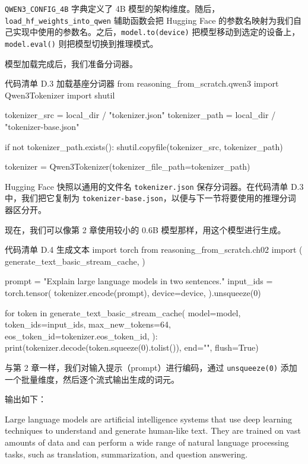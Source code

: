 \texttt{QWEN3\_CONFIG\_4B} 字典定义了 4B 模型的架构维度。随后，\texttt{load\_hf\_weights\_into\_qwen} 辅助函数会把 Hugging Face 的参数名映射为我们自己实现中使用的参数名。之后，\texttt{model.to(device)} 把模型移动到选定的设备上，\texttt{model.eval()} 则把模型切换到推理模式。

模型加载完成后，我们准备分词器。

\begin{codeboxt}{代码清单 D.3 加载基座分词器}
from reasoning_from_scratch.qwen3 import Qwen3Tokenizer
import shutil

tokenizer_src = local_dir / "tokenizer.json"
tokenizer_path = local_dir / "tokenizer-base.json"

if not tokenizer_path.exists():
    shutil.copyfile(tokenizer_src, tokenizer_path)

tokenizer = Qwen3Tokenizer(tokenizer_file_path=tokenizer_path)
\end{codeboxt}

Hugging Face 快照以通用的文件名 \texttt{tokenizer.json} 保存分词器。在代码清单 D.3 中，我们把它复制为 \texttt{tokenizer-base.json}，以便与下一节将要使用的推理分词器区分开。

现在，我们可以像第 2 章使用较小的 0.6B 模型那样，用这个模型进行生成。

\begin{codeboxt}{代码清单 D.4 生成文本}
import torch
from reasoning_from_scratch.ch02 import (
    generate_text_basic_stream_cache,
)

prompt = "Explain large language models in two sentences."
input_ids = torch.tensor(
    tokenizer.encode(prompt),
    device=device,
).unsqueeze(0)

for token in generate_text_basic_stream_cache(
    model=model,
    token_ids=input_ids,
    max_new_tokens=64,
    eos_token_id=tokenizer.eos_token_id,
):
    print(tokenizer.decode(token.squeeze(0).tolist()), end="", flush=True)
\end{codeboxt}

与第 2 章一样，我们对输入提示（prompt）进行编码，通过 \texttt{unsqueeze(0)} 添加一个批量维度，然后逐个流式输出生成的词元。

输出如下：

\begin{codebox}
 Large language models are artificial intelligence systems that use deep learning
techniques to understand and generate human-like text. They are trained on vast
amounts of data and can perform a wide range of natural language processing tasks,
such as translation, summarization, and question answering.
\end{codebox}

